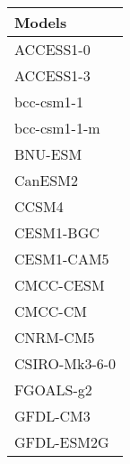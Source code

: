 \documentclass{ametsocV5}
\begin{document}
\begin{table}[t]
\begin{center}
  \renewcommand{\arraystretch}{1.0}
  \begin{tabular}{ l }
    Models          \\%
    \hline
    ACCESS1-0       \\%
    ACCESS1-3       \\%
    bcc-csm1-1      \\%
    bcc-csm1-1-m    \\%
    BNU-ESM         \\%
    CanESM2         \\%
    CCSM4           \\%
    CESM1-BGC       \\%
    CESM1-CAM5      \\%
    CMCC-CESM       \\%
    CMCC-CM         \\%
    CNRM-CM5        \\%
    CSIRO-Mk3-6-0   \\%
    FGOALS-g2       \\%
    GFDL-CM3        \\%
    GFDL-ESM2G      \\%

\end{tabular}
\end{center}
\end{table}
\end{document}
